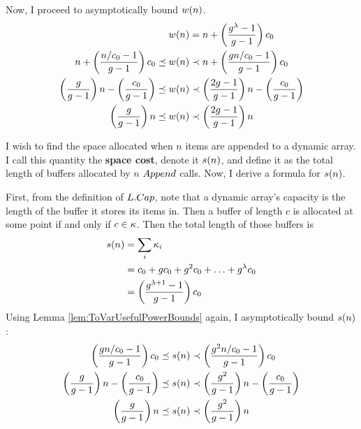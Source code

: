 Now, I proceed to asymptotically bound $w(n)$.
\begin{align*}
w(n) &= n + \left( \frac{g^\lambda - 1}{g - 1} \right) c_0\\
n + \left( \frac{n / c_0 - 1}{g - 1} \right) c_0 \preceq w(n) &\prec n + \left( \frac{g{n} / c_0 - 1}{g - 1} \right) c_0\\
\left( \frac{g}{g - 1} \right) n - \left( \frac{c_0}{g - 1} \right) \preceq w(n) &\prec \left( \frac{2g - 1}{g - 1} \right) n - \left( \frac{c_0}{g - 1} \right)\\
\left( \frac{g}{g - 1} \right) n \preceq w(n) &\prec \left( \frac{2g - 1}{g - 1} \right) n
\end{align*}
\HdrSpaceComplex

I wish to find the space allocated when $n$ items are appended to a dynamic array. I call this quantity the \textbf{space cost}, denote it $s(n)$, and define it as the total length of buffers allocated by $n$ $Append$ calls. Now, I derive a formula for $s(n)$.

First, from the definition of $L.Cap$, note that a dynamic array's capacity is the length of the buffer it stores its items in. Then a buffer of length $c$ is allocated at some point if and only if $c \in \kappa$. Then the total length of those buffers is
\begin{align*}
s(n) &= \sum_i {\kappa_i}\\
&= c_0 + gc_0 + g^2c_0 + \ldots + g^\lambda c_0\\
&= \left( \frac{g^{\lambda + 1} - 1}{g - 1} \right) c_0
\end{align*}
Using Lemma \ref{lem:ToVarUsefulPowerBounds} again, I asymptotically bound $s(n)$:
\begin{align*}
\left( \frac{g{n} / c_0 - 1}{g - 1} \right) c_0 \preceq s(n) &\prec \left( \frac{g^2{n} / c_0 - 1}{g - 1} \right) c_0\\
\left( \frac{g}{g - 1} \right) n - \left( \frac{c_0}{g - 1} \right) \preceq s(n) &\prec \left( \frac{g^2}{g - 1} \right) n - \left( \frac{c_0}{g - 1} \right)\\
\left( \frac{g}{g - 1} \right) n \preceq s(n) &\prec \left( \frac{g^2}{g - 1} \right) n
\end{align*}